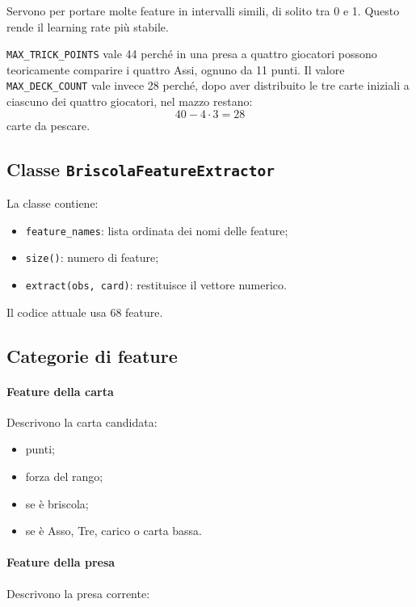 \documentclass[11pt,a4paper]{article}
\begin{document}
Servono per portare molte feature in intervalli simili, di solito tra 0 e 1.
Questo rende il learning rate più stabile.

\texttt{MAX\_TRICK\_POINTS} vale 44 perché in una presa a quattro giocatori
possono teoricamente comparire i quattro Assi, ognuno da 11 punti. Il valore
\texttt{MAX\_DECK\_COUNT} vale invece 28 perché, dopo aver distribuito le tre
carte iniziali a ciascuno dei quattro giocatori, nel mazzo restano:
\[
40 - 4 \cdot 3 = 28
\]
carte da pescare.

\subsection{Classe \texttt{BriscolaFeatureExtractor}}

La classe contiene:

\begin{itemize}
  \item \texttt{feature\_names}: lista ordinata dei nomi delle feature;
  \item \texttt{size()}: numero di feature;
  \item \texttt{extract(obs, card)}: restituisce il vettore numerico.
\end{itemize}

Il codice attuale usa 68 feature.

\subsection{Categorie di feature}

\paragraph{Feature della carta}

Descrivono la carta candidata:

\begin{itemize}
  \item punti;
  \item forza del rango;
  \item se è briscola;
  \item se è Asso, Tre, carico o carta bassa.
\end{itemize}

\paragraph{Feature della presa}

Descrivono la presa corrente:
\end{document}

